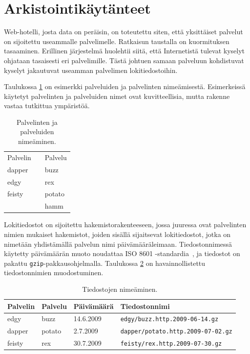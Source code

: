 \section{Arkistointikäytänteet}

Web-hotelli, josta data on peräisin, on toteutettu siten, että yksittäiset palvelut on
sijoitettu useammalle palvelimelle. Ratkaisun taustalla on
kuormituksen tasaaminen. Erillinen järjestelmä huolehtii siitä, että
Internetistä tulevat kyselyt ohjataan tasaisesti eri
palvelimille. Tästä johtuen samaan palveluun kohdistuvat kyselyt
jakautuvat useamman palvelimen lokitiedostoihin.

Taulukossa \ref{nimet} on esimerkki palveluiden ja palvelinten
nimeämisestä. Esimerkeissä käytetyt palvelinten ja palveluiden nimet
ovat kuvitteellisia, mutta rakenne vastaa tutkittua ympäristöä.

\begin{table}[h]
\centering
\begin{tabular}{lll}
Palvelin && Palvelu \\
\cline{1-1}\cline{3-3}
dapper && buzz \\
edgy && rex \\
feisty && potato \\
&& hamm \\
\end{tabular}
\caption{Palvelinten ja palveluiden nimeäminen.}
\label{nimet}
\end{table}

Lokitiedostot on sijoitettu hakemistorakenteeseen, jossa juuressa ovat
palvelinten nimien mukaiset hakemistot, joiden sisällä sijaitsevat
lokitiedostot, jotka on nimetään yhdistämällä palvelun nimi
päivämääräleimaan. Tiedostonnimessä käytetty päivämäärän muoto
noudattaa ISO 8601 -standardia~\cite{iso8601}, ja tiedostot on pakattu
\texttt{gzip}-pakkausohjelmalla. Taulukossa \ref{tiedostot}
on havainnollistettu tiedostonnimien muodostuminen.

\begin{table}[h]
\centering
\begin{tabular}{llll}
Palvelin & Palvelu & Päivämäärä & Tiedostonnimi \\
\hline
edgy & buzz & 14.6.2009 & \texttt{edgy/buzz.http.2009-06-14.gz}\\ 
dapper & potato & 2.7.2009 & \texttt{dapper/potato.http.2009-07-02.gz}\\
feisty & rex & 30.7.2009 & \texttt{feisty/rex.http.2009-07-30.gz}\\
\end{tabular}
\caption{Tiedostojen nimeäminen.}
\label{tiedostot}
\end{table}

